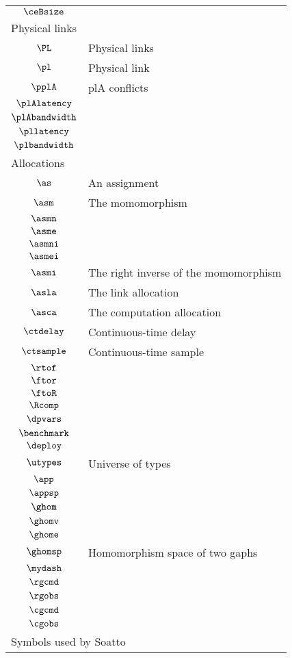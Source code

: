 \begin{longtable}{cl}
 $\ceBsize$ & \\ 
 \multicolumn{2}{l}{Physical links}\\ 
 \hline
$\PL$ &  Physical links\\ 
 $\pl$ &  Physical link\\ 
 $\pplA$ &  plA conflicts\\ 
 $\plAlatency$ & \\ 
 $\plAbandwidth$ & \\ 
 $\pllatency$ & \\ 
 $\plbandwidth$ & \\ 
 \multicolumn{2}{l}{Allocations}\\ 
 \hline
$\as$ &  An assignment\\ 
 $\asm$ &  The momomorphism \\ 
 $\asmn$ & \\ 
 $\asme$ & \\ 
 $\asmni$ & \\ 
 $\asmei$ & \\ 
 $\asmi$ &  The right inverse of the momomorphism \\ 
 $\asla$ &  The link allocation\\ 
 $\asca$ &  The computation allocation\\ 
 $\ctdelay$ &  Continuous-time delay\\ 
 $\ctsample$ &  Continuous-time sample\\ 
 $\rtof$ & \\ 
 $\ftor$ & \\ 
 $\ftoR$ & \\ 
 $\Rcomp$ & \\ 
 $\dpvars$ & \\ 
 $\benchmark$ & \\ 
 $\deploy$ & \\ 
 $\utypes$ &  Universe of types\\ 
 $\app$ & \\ 
 $\appsp$ & \\ 
 $\ghom$ & \\ 
 $\ghomv$ & \\ 
 $\ghome$ & \\ 
 $\ghomsp$ &  Homomorphism space of two gaphs\\ 
 $\mydash$ & \\ 
 $\rgcmd$ & \\ 
 $\rgobs$ & \\ 
 $\cgcmd$ & \\ 
 $\cgobs$ & \\ 
 \multicolumn{2}{l}{Symbols used by Soatto}\\ 

\end{longtable}
